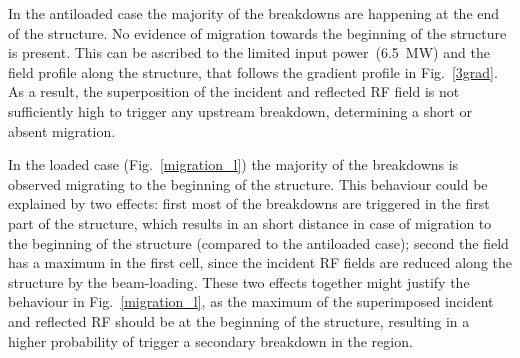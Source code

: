 In the antiloaded case the majority of the breakdowns are happening at the end of the structure. No evidence of migration towards the beginning of the structure is present. This can be ascribed to the limited input power~(6.5~MW) and the field profile along the structure, that follows the gradient profile in Fig.~\ref{3grad}. As a result, the superposition of the incident and reflected RF field is not sufficiently high to trigger any upstream breakdown, determining a short or absent migration.

In the loaded case (Fig.~\ref{migration_l}) the majority of the breakdowns is observed migrating to the beginning of the structure. This behaviour could be explained by two effects: first most of the breakdowns are triggered in the first part of the structure, which results in an short distance in case of migration to the beginning of the structure (compared to the antiloaded case); second the field has a maximum in the first cell, since the incident RF fields are reduced along the structure by the beam-loading. These two effects together might justify the behaviour in Fig.~\ref{migration_l}, as the maximum of the superimposed incident and reflected RF should be at the beginning of the structure, resulting in a higher probability of trigger a secondary breakdown in the region.

